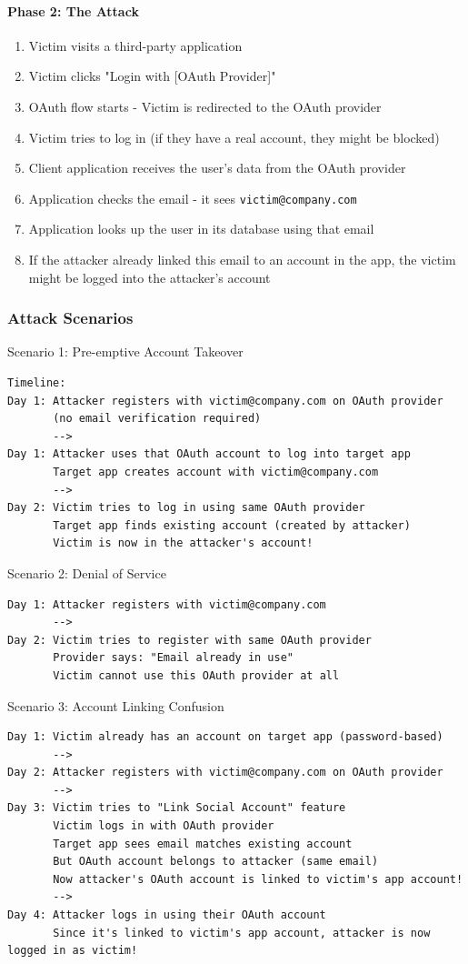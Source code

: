 \documentclass[12pt,a4paper]{article}
\begin{document}
\paragraph{Phase 2: The Attack}
\begin{enumerate}
    \item Victim visits a third-party application
    \item Victim clicks "Login with [OAuth Provider]"
    \item OAuth flow starts - Victim is redirected to the OAuth provider
    \item Victim tries to log in (if they have a real account, they might be blocked)
    \item Client application receives the user's data from the OAuth provider
    \item Application checks the email - it sees \texttt{victim@company.com}
    \item Application looks up the user in its database using that email
    \item If the attacker already linked this email to an account in the app, the victim might be logged into the attacker's account
\end{enumerate}

\subsubsection{Attack Scenarios}
Scenario 1: Pre-emptive Account Takeover
\begin{lstlisting}
Timeline:
Day 1: Attacker registers with victim@company.com on OAuth provider
       (no email verification required)
       -->
Day 1: Attacker uses that OAuth account to log into target app
       Target app creates account with victim@company.com
       -->
Day 2: Victim tries to log in using same OAuth provider
       Target app finds existing account (created by attacker)
       Victim is now in the attacker's account!
\end{lstlisting}

Scenario 2: Denial of Service
\begin{lstlisting}
Day 1: Attacker registers with victim@company.com
       -->
Day 2: Victim tries to register with same OAuth provider
       Provider says: "Email already in use"
       Victim cannot use this OAuth provider at all
\end{lstlisting}

Scenario 3: Account Linking Confusion
\begin{lstlisting}
Day 1: Victim already has an account on target app (password-based)
       -->
Day 2: Attacker registers with victim@company.com on OAuth provider
       -->
Day 3: Victim tries to "Link Social Account" feature
       Victim logs in with OAuth provider
       Target app sees email matches existing account
       But OAuth account belongs to attacker (same email)
       Now attacker's OAuth account is linked to victim's app account!
       -->
Day 4: Attacker logs in using their OAuth account
       Since it's linked to victim's app account, attacker is now logged in as victim!
\end{lstlisting}
\end{document}
